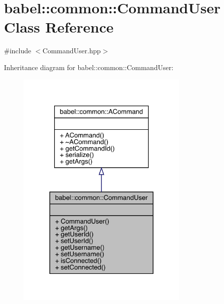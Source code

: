 \hypertarget{classbabel_1_1common_1_1_command_user}{}\section{babel\+:\+:common\+:\+:Command\+User Class Reference}
\label{classbabel_1_1common_1_1_command_user}


{\ttfamily \#include $<$Command\+User.\+hpp$>$}



Inheritance diagram for babel\+:\+:common\+:\+:Command\+User\+:\nopagebreak
\begin{figure}[H]
\begin{center}
\leavevmode
\includegraphics[width=237pt]{classbabel_1_1common_1_1_command_user__inherit__graph}
\end{center}
\end{figure}


